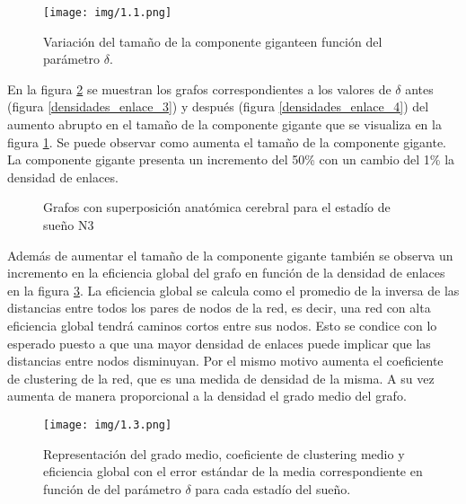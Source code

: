 \documentclass{article}
\begin{document}
\begin{figure}[H]
    \centering
    {\texttt{[image: img/1.1.png]}}
    \caption[]{Variación del tamaño de la componente gigante\footnotemark en función del parámetro $\delta$.}
    \label{fig:variacion_delta}
\end{figure}

En la figura \ref{densidades_enlace} se muestran los grafos correspondientes a los valores de $\delta$ antes (figura \ref{densidades_enlace_3}) y después (figura \ref{densidades_enlace_4}) del aumento abrupto en el tamaño de la componente gigante que se visualiza en la figura \ref{fig:variacion_delta}. Se puede observar como aumenta el tamaño de la componente gigante. La componente gigante presenta un incremento del 50\% con un cambio del 1\% la densidad de enlaces.

\begin{figure}[H]
    \centering
    \hfill
    \hfill
    \caption[]{Grafos con superposición anatómica cerebral para el estadío de sueño N3\footnotemark}
    \label{densidades_enlace}
\end{figure}

Además de aumentar el tamaño de la componente gigante también se observa un incremento en la eficiencia global del grafo en función de la densidad de enlaces en la figura \ref{fig:k_clust_eff_delta}. La eficiencia global se calcula como el promedio de la inversa de las distancias entre todos los pares de nodos de la red, es decir, una red con alta eficiencia global tendrá caminos cortos entre sus nodos. Esto se condice con lo esperado puesto a que una mayor densidad de enlaces puede implicar que las distancias entre nodos disminuyan. Por el mismo motivo aumenta el coeficiente de clustering de la red, que es una medida de densidad de la misma. A su vez aumenta de manera proporcional a la densidad el grado medio del grafo.

\begin{figure}[H]
    \centering
    {\texttt{[image: img/1.3.png]}}
    \caption{Representación del grado medio, coeficiente de clustering medio y eficiencia global con el error estándar de la media correspondiente en función de del parámetro $\delta$ para cada estadío del sueño.}
    \label{fig:k_clust_eff_delta}
\end{figure}
\end{document}

